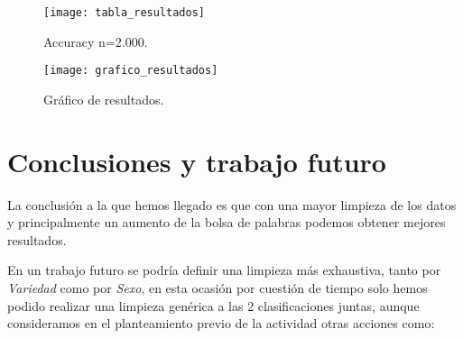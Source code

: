 \documentclass[11pt,a4paper]{article}
\begin{document}
\begin{figure}[htb]
\centering
\texttt{[image: tabla\_resultados]}
\caption{Accuracy n=2.000.} \label{fig:tabla_resultados}
\end{figure}

\begin{figure}[htb]
\centering
\texttt{[image: grafico\_resultados]}
\caption{Gráfico de resultados.} \label{fig:grafico_resultados}
\end{figure}

\section{Conclusiones y trabajo futuro}

La conclusión a la que hemos llegado es que con una mayor limpieza de los datos y principalmente un aumento de la bolsa de palabras podemos obtener mejores resultados.

En un trabajo futuro se podría definir una limpieza más exhaustiva, tanto por {\em Variedad} como por {\em Sexo}, en esta ocasión por cuestión de tiempo solo hemos podido realizar una limpieza genérica a las 2 clasificaciones juntas, aunque consideramos en el planteamiento previo de la actividad otras acciones como:
\end{document}
